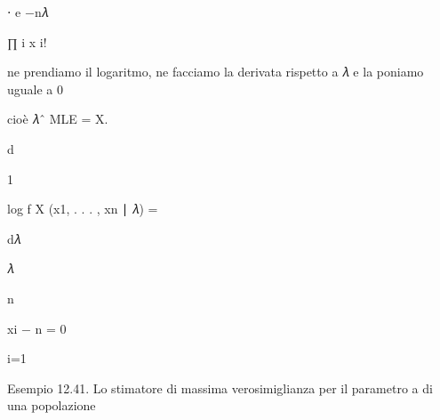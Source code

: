 \documentclass[a4paper,portrait,12pt]{article}
\begin{document}
\begin{flushleft}
⋅ e $-$n𝜆
\end{flushleft}


\begin{flushleft}
∏ i x i!
\end{flushleft}





\begin{flushleft}
ne prendiamo il logaritmo, ne facciamo la derivata rispetto a 𝜆 e la poniamo uguale a 0
\end{flushleft}





\begin{flushleft}
cio\`{e} 𝜆ˆ MLE = X.
\end{flushleft}





\begin{flushleft}
d
\end{flushleft}


1


\begin{flushleft}
log f X (x1, . . . , xn ∣ 𝜆) =
\end{flushleft}


\begin{flushleft}
d𝜆
\end{flushleft}


\begin{flushleft}
𝜆
\end{flushleft}





\begin{flushleft}
n
\end{flushleft}





\begin{flushleft}
xi $-$ n = 0
\end{flushleft}


\begin{flushleft}
i=1
\end{flushleft}





\begin{flushleft}
Esempio 12.41. Lo stimatore di massima verosimiglianza per il parametro a di una popolazione
\end{flushleft}
\end{document}
